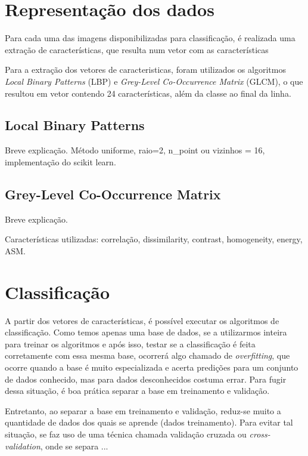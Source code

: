 \documentclass[conference]{IEEEtran}
\begin{document}
\section{Representação dos dados}

Para cada uma das imagens disponibilizadas para classificação, é realizada uma
extração de características, que resulta num vetor com as características

Para a extração dos vetores de caracteristicas, foram utilizados os algoritmos
\emph{Local Binary Patterns} (LBP) e \emph{Grey-Level Co-Occurrence Matrix}
(GLCM), o que resultou em vetor contendo 24 características, além da classe ao
final da linha.

\subsection{Local Binary Patterns}
Breve explicação. Método uniforme, raio=2, n\_point ou vizinhos = 16,
implementação do scikit learn.

\subsection{Grey-Level Co-Occurrence Matrix}

Breve explicação.

Características utilizadas: correlação, dissimilarity, contrast, homogeneity,
energy, ASM.

\section{Classificação}

A partir dos vetores de características, é possível executar os
algoritmos de classificação. Como temos apenas uma base de dados, se a
utilizarmos inteira para treinar os algoritmos e após isso, testar se a
classificação é feita corretamente com essa mesma base, ocorrerá algo chamado de
\emph{overfitting}, que ocorre quando a base é muito especializada e acerta predições
para um conjunto de dados conhecido, mas para dados desconhecidos costuma errar.
Para fugir dessa situação, é boa prática separar a base em treinamento e
validação.

Entretanto, ao separar a base em treinamento e validação, reduz-se muito a
quantidade de dados dos quais se aprende (dados treinamento). Para evitar tal
situação, se faz uso de uma técnica chamada validação cruzada ou
\emph{cross-validation}, onde se separa ...
\end{document}
